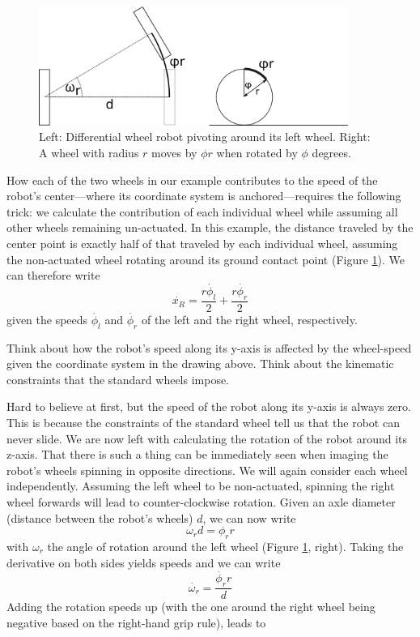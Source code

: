 \begin{figure}[htb!]
	\centering
		\includegraphics[width=0.9\textwidth]{figs/wheelrotation.png}
	\caption{Left: Differential wheel robot pivoting around its left wheel. Right: A wheel with radius $r$ moves by $\phi r$ when rotated by $\phi$ degrees.}
	\label{fig:wheelrotation}
\end{figure}

How each of the two wheels in our example contributes to the speed of the robot's center---where its coordinate system is anchored---requires the following trick: we calculate the contribution of each individual wheel while assuming all other wheels remaining un-actuated. In this example, the distance traveled by the center point is exactly half of that traveled by each individual wheel, assuming the non-actuated wheel rotating around its ground contact point (Figure \ref{fig:wheelrotation}). We can therefore write
\begin{equation}
\dot{x_R}=\frac{r\dot{\phi_l}}{2}+\frac{r\dot{\phi_r}}{2}
\end{equation}
given the speeds $ \dot{\phi_l}$ and $ \dot{\phi_r}$ of the left and the right wheel, respectively.

\begin{framed}
Think about how the robot's speed along its y-axis is affected by the wheel-speed given the coordinate system in the drawing above. Think about the kinematic constraints that the standard wheels impose.
\end{framed}

Hard to believe at first, but the speed of the robot along its y-axis is always zero. This is because the constraints of the standard wheel tell us that the robot can never slide. We are now left with calculating the rotation of the robot around its z-axis. That there is such a thing can be immediately seen when imaging the robot's wheels spinning in opposite directions. We will again consider each wheel independently. Assuming the left wheel to be non-actuated, spinning the right wheel forwards will lead to counter-clockwise rotation. Given an axle diameter (distance between the robot's wheels) $ d$, we can now write
\begin{equation}
\omega_r d = \phi_r r
\end{equation}
with $ \omega_r$ the angle of rotation around the left wheel (Figure \ref{fig:wheelrotation}, right). Taking the derivative on both sides yields speeds and we can write
\begin{equation}
\dot{\omega_r} = \frac{\dot{\phi_r} r}{d}
\end{equation}
Adding the rotation speeds up (with the one around the right wheel being negative based on the right-hand grip rule), leads to

